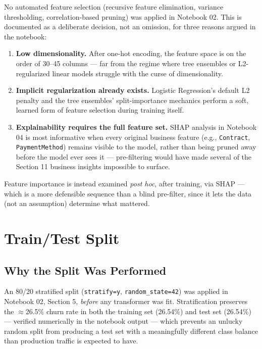 \documentclass[11pt]{article}
\newcommand{\artifact}[1]{\texttt{\color{navy}#1}}
\begin{document}
No automated feature selection (recursive feature elimination, variance thresholding, correlation-based pruning) was applied in Notebook 02. This is documented as a deliberate decision, not an omission, for three reasons argued in the notebook:

\begin{enumerate}[leftmargin=1.4em]
    \item \textbf{Low dimensionality.} After one-hot encoding, the feature space is on the order of 30--45 columns --- far from the regime where tree ensembles or L2-regularized linear models struggle with the curse of dimensionality.
    \item \textbf{Implicit regularization already exists.} Logistic Regression's default L2 penalty and the tree ensembles' split-importance mechanics perform a soft, learned form of feature selection during training itself.
    \item \textbf{Explainability requires the full feature set.} SHAP analysis in Notebook 04 is most informative when every original business feature (e.g., \artifact{Contract}, \artifact{PaymentMethod}) remains visible to the model, rather than being pruned away before the model ever sees it --- pre-filtering would have made several of the Section 11 business insights impossible to surface.
\end{enumerate}

Feature importance is instead examined \emph{post hoc}, after training, via SHAP --- which is a more defensible sequence than a blind pre-filter, since it lets the data (not an assumption) determine what mattered.

\section{Train/Test Split}

\subsection{Why the Split Was Performed}

An 80/20 stratified split (\texttt{stratify=y}, \texttt{random\_state=42}) was applied in Notebook 02, Section 5, \emph{before} any transformer was fit. Stratification preserves the $\approx$26.5\% churn rate in both the training set (26.54\%) and test set (26.54\%) --- verified numerically in the notebook output --- which prevents an unlucky random split from producing a test set with a meaningfully different class balance than production traffic is expected to have.
\end{document}
